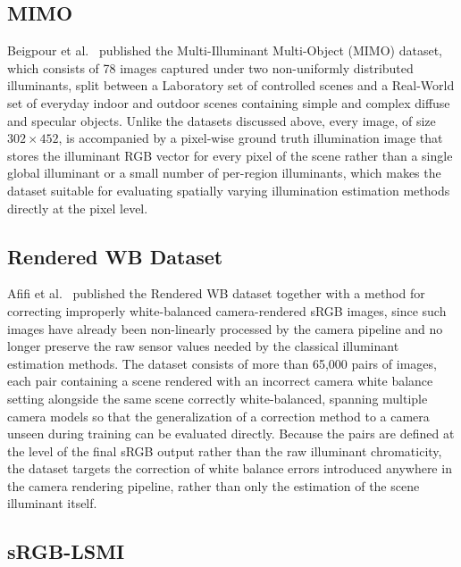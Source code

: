 \subsection{MIMO}

Beigpour et al.~\cite{mimoAndConditionalRandomFields} published the Multi-Illuminant Multi-Object (MIMO) dataset, which consists of 78 images captured under two non-uniformly distributed illuminants, split between a Laboratory set of controlled scenes and a Real-World set of everyday indoor and outdoor scenes containing simple and complex diffuse and specular objects. Unlike the datasets discussed above, every image, of size $302 \times 452$, is accompanied by a pixel-wise ground truth illumination image that stores the illuminant RGB vector for every pixel of the scene rather than a single global illuminant or a small number of per-region illuminants, which makes the dataset suitable for evaluating spatially varying illumination estimation methods directly at the pixel level.

\subsection{Rendered WB Dataset}

Afifi et al.~\cite{afifiRenderedWB} published the Rendered WB dataset together with a method for correcting improperly white-balanced camera-rendered sRGB images, since such images have already been non-linearly processed by the camera pipeline and no longer preserve the raw sensor values needed by the classical illuminant estimation methods. The dataset consists of more than 65,000 pairs of images, each pair containing a scene rendered with an incorrect camera white balance setting alongside the same scene correctly white-balanced, spanning multiple camera models so that the generalization of a correction method to a camera unseen during training can be evaluated directly. Because the pairs are defined at the level of the final sRGB output rather than the raw illuminant chromaticity, the dataset targets the correction of white balance errors introduced anywhere in the camera rendering pipeline, rather than only the estimation of the scene illuminant itself.

\subsection{sRGB-LSMI}


